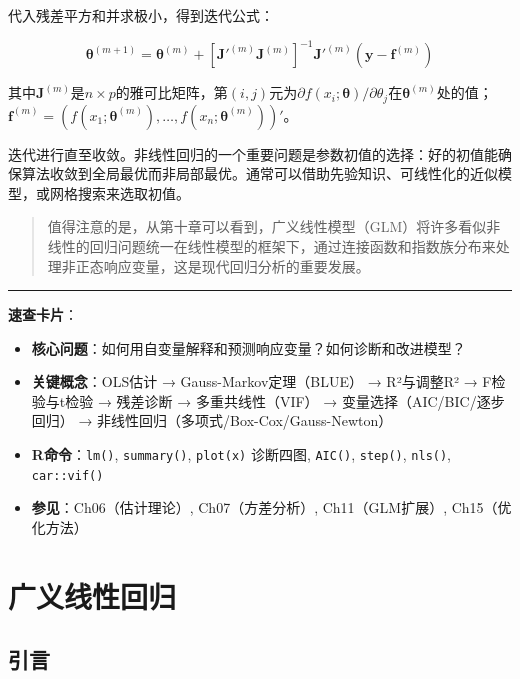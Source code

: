 \documentclass[
]{book}
\providecommand{\tightlist}{%
  \setlength{\itemsep}{0pt}\setlength{\parskip}{0pt}}
\begin{document}
代入残差平方和并求极小，得到迭代公式：

\[
\boldsymbol{\theta}^{(m+1)} = \boldsymbol{\theta}^{(m)} + [\mathbf{J}'^{(m)} \mathbf{J}^{(m)}]^{-1} \mathbf{J}'^{(m)} (\mathbf{y} - \mathbf{f}^{(m)})
\]

其中\(\mathbf{J}^{(m)}\)是\(n \times p\)的雅可比矩阵，第\((i, j)\)元为\(\partial f(x_i; \boldsymbol{\theta}) / \partial \theta_j\)在\(\boldsymbol{\theta}^{(m)}\)处的值；\(\mathbf{f}^{(m)} = (f(x_1; \boldsymbol{\theta}^{(m)}), \ldots, f(x_n; \boldsymbol{\theta}^{(m)}))'\)。

迭代进行直至收敛。非线性回归的一个重要问题是参数初值的选择：好的初值能确保算法收敛到全局最优而非局部最优。通常可以借助先验知识、可线性化的近似模型，或网格搜索来选取初值。

\begin{quote}
值得注意的是，从第十章可以看到，广义线性模型（GLM）将许多看似非线性的回归问题统一在线性模型的框架下，通过连接函数和指数族分布来处理非正态响应变量，这是现代回归分析的重要发展。
\end{quote}

\begin{center}\rule{0.5\linewidth}{0.5pt}\end{center}

\textbf{速查卡片}：

\begin{itemize}
\tightlist
\item
  \textbf{核心问题}：如何用自变量解释和预测响应变量？如何诊断和改进模型？
\item
  \textbf{关键概念}：OLS估计 → Gauss-Markov定理（BLUE） → R²与调整R² → F检验与t检验 → 残差诊断 → 多重共线性（VIF） → 变量选择（AIC/BIC/逐步回归） → 非线性回归（多项式/Box-Cox/Gauss-Newton）
\item
  \textbf{R命令}：\texttt{lm()}, \texttt{summary()}, \texttt{plot(x)} 诊断四图, \texttt{AIC()}, \texttt{step()}, \texttt{nls()}, \texttt{car::vif()}
\item
  \textbf{参见}：Ch06（估计理论）, Ch07（方差分析）, Ch11（GLM扩展）, Ch15（优化方法）
\end{itemize}

\chapter{广义线性回归}\label{ux5e7fux4e49ux7ebfux6027ux56deux5f52}

\section{引言}\label{ux5f15ux8a00}
\end{document}
